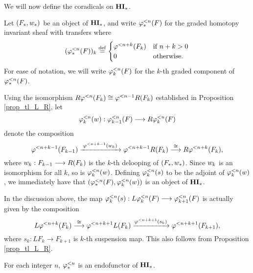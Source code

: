 We will now define the coradicals on $\HM$. 

\begin{defn}\label{def_corad_HM}
Let $(F_*, \deloop_*)$ 
be an object of $\HM$, and write $\tlHM{n}(F)$ for the graded 
homotopy invariant sheaf with transfers where
\[
(\tlHM{n}(F))_k \defeq
\begin{cases}
   \tlHI{n + k}(F_k) & \textrm{if } n + k > 0 \\
   0                 & \textrm{otherwise}.
\end{cases}
\]
For ease of notation, we will write $\tlHM[k]{n}(F)$ for the 
$k$-th graded component of $\tlHM{n}(F)$.
\end{defn}

Using the isomorphism $R\tlHI{n}(F_k) \cong \tlHI{n - 1}R(F_k)$ 
established in Proposition \ref{prop_tl_L_R}, let
\[
\deloopTL[k]{n} : \tlHM[k - 1]{n}(F) \to R \tlHM[k]{n}(F) 
\]
denote the composition
\begin{equation}\label{eq_deloop_def}
\tlHI{n + k - 1}(F_{k - 1})
   \xrightarrow{\;\tlHI{n + k - 1}(\deloop_k)\;} 
   \tlHI{n + k - 1} R(F_k) \stackrel{\cong}{\to} 
   R \tlHI{n + k}(F_k),
\end{equation}
where $\deloop_k: F_{k - 1} \to R(F_k)$ is the $k$-th delooping
of $(F_*, \deloop_*)$. Since $\deloop_k$ is an isomorphism 
for all $k$, so is $\deloopTL[k]{n}$. Defining $\suspTL[k]{n}$
to be the adjoint of $\deloopTL[k]{n}$, we immediately have that
$(\tlHM{n}(F), \deloopTL[k]{n})$ is an object of $\HM$. 

\begin{rmk*}
In the discussion above, the map $\suspTL[k]{n}: L\tlHM[k]{n}(F) \to
\tlHM[k + 1]{n}(F)$ is actually given by the composition
\[
L \tlHI{n + k}(F_{k}) \stackrel{\cong}{\to}
\tlHI{n + k + 1}L(F_{k}) \xrightarrow{\tlHI{n + k + 1}(s_k)}
\tlHI{n + k + 1}(F_{k + 1}),
\]
where $s_k: LF_k \to F_{k + 1}$ is $k$-th suspension map. This also
follows from Proposition \ref{prop_tl_L_R}.
\end{rmk*}

\begin{lem}\label{lem_tlHM_is_functor}
For each integer $n$, $\tlHM{n}$ is an endofunctor of $\HM$.
\end{lem}

